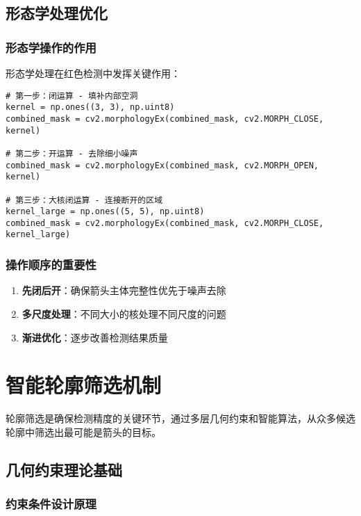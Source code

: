 \documentclass[12pt]{article}
\begin{document}
\subsection{形态学处理优化}

\subsubsection{形态学操作的作用}

形态学处理在红色检测中发挥关键作用：

\begin{lstlisting}[caption=形态学处理优化]
# 第一步：闭运算 - 填补内部空洞
kernel = np.ones((3, 3), np.uint8)
combined_mask = cv2.morphologyEx(combined_mask, cv2.MORPH_CLOSE, kernel)

# 第二步：开运算 - 去除细小噪声
combined_mask = cv2.morphologyEx(combined_mask, cv2.MORPH_OPEN, kernel)

# 第三步：大核闭运算 - 连接断开的区域
kernel_large = np.ones((5, 5), np.uint8)
combined_mask = cv2.morphologyEx(combined_mask, cv2.MORPH_CLOSE, kernel_large)
\end{lstlisting}

\subsubsection{操作顺序的重要性}

\begin{enumerate}
    \item \textbf{先闭后开}：确保箭头主体完整性优先于噪声去除
    \item \textbf{多尺度处理}：不同大小的核处理不同尺度的问题
    \item \textbf{渐进优化}：逐步改善检测结果质量
\end{enumerate}

\section{智能轮廓筛选机制}

轮廓筛选是确保检测精度的关键环节，通过多层几何约束和智能算法，从众多候选轮廓中筛选出最可能是箭头的目标。

\subsection{几何约束理论基础}

\subsubsection{约束条件设计原理}
\end{document}
